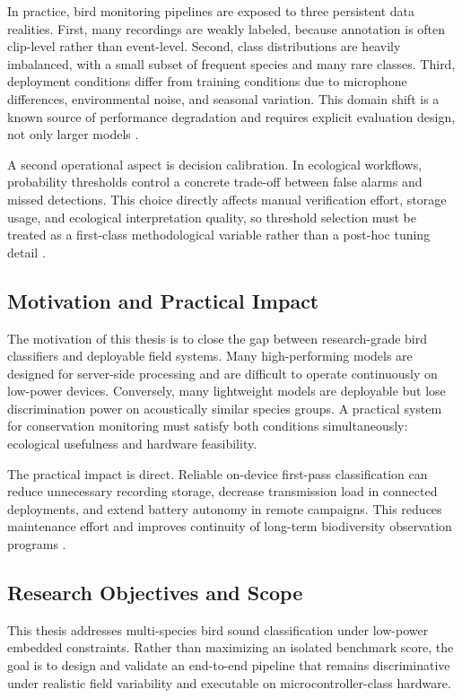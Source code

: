\documentclass[a4paper,singleside,12pt]{report} %
\begin{document}
	In practice, bird monitoring pipelines are exposed to three persistent data realities. First, many recordings are weakly labeled, because annotation is often clip-level rather than event-level. Second, class distributions are heavily imbalanced, with a small subset of frequent species and many rare classes. Third, deployment conditions differ from training conditions due to microphone differences, environmental noise, and seasonal variation. This domain shift is a known source of performance degradation and requires explicit evaluation design, not only larger models \cite{stowell2019birdaudiodetection,birdnet2021,sheikh2024birdwhisperer}.

	A second operational aspect is decision calibration. In ecological workflows, probability thresholds control a concrete trade-off between false alarms and missed detections. This choice directly affects manual verification effort, storage usage, and ecological interpretation quality, so threshold selection must be treated as a first-class methodological variable rather than a post-hoc tuning detail \cite{perezgranados2023birdnet,stowell2019birdaudiodetection}.
	\subsection{Motivation and Practical Impact}
	The motivation of this thesis is to close the gap between research-grade bird classifiers and deployable field systems. Many high-performing models are designed for server-side processing and are difficult to operate continuously on low-power devices. Conversely, many lightweight models are deployable but lose discrimination power on acoustically similar species groups. A practical system for conservation monitoring must satisfy both conditions simultaneously: ecological usefulness and hardware feasibility.

	The practical impact is direct. Reliable on-device first-pass classification can reduce unnecessary recording storage, decrease transmission load in connected deployments, and extend battery autonomy in remote campaigns. This reduces maintenance effort and improves continuity of long-term biodiversity observation programs \cite{sabbella2022alwayson,tinychirp2024,gallacher2021shazam}.

	\subsection{Research Objectives and Scope}
	This thesis addresses multi-species bird sound classification under low-power embedded constraints. Rather than maximizing an isolated benchmark score, the goal is to design and validate an end-to-end pipeline that remains discriminative under realistic field variability and executable on microcontroller-class hardware.
\end{document}
